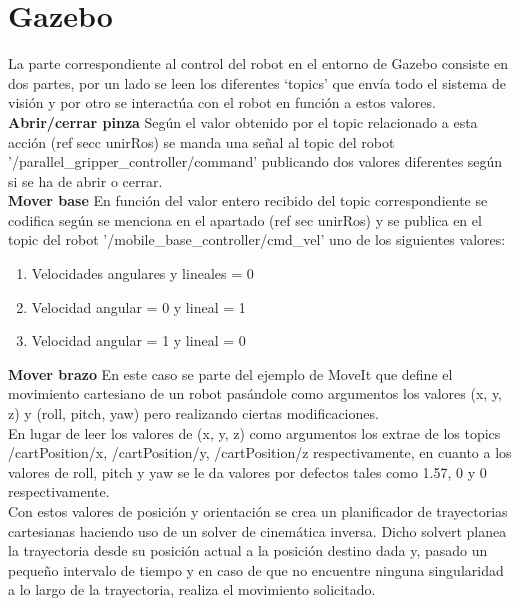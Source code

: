 \section{Gazebo}
La parte correspondiente al control del robot en el entorno de Gazebo consiste en dos partes, por un lado se leen los diferentes ‘topics’ que envía todo el sistema de visión y por otro se interactúa con el robot en función a estos valores.\\
\textbf{Abrir/cerrar pinza}
Según el valor obtenido por el topic relacionado a esta acción (ref secc unirRos) se manda una señal al topic del robot '/parallel_gripper_controller/command'  publicando dos valores diferentes según si se ha de abrir o cerrar.\\
\textbf{Mover base}
En función del valor entero recibido del topic correspondiente se codifica según se menciona en el apartado (ref sec unirRos) y se publica en el topic del robot '/mobile_base_controller/cmd_vel' uno de los siguientes valores:\\
\begin{enumerate}
  \item Velocidades angulares y lineales = 0
  \item Velocidad angular = 0 y lineal = 1
  \item Velocidad angular = 1 y lineal = 0
\end{enumerate}
\textbf{Mover brazo}
En este caso se parte del ejemplo de MoveIt que define el movimiento cartesiano de un robot pasándole como argumentos los valores (x, y, z) y (roll, pitch, yaw) pero realizando ciertas modificaciones.\\

En lugar de leer los valores de (x, y, z) como argumentos los extrae de los topics /cartPosition/x, /cartPosition/y, /cartPosition/z respectivamente, en cuanto a los valores de roll, pitch y yaw se le da valores por defectos tales como 1.57, 0 y 0 respectivamente.\\

Con estos valores de posición y orientación se crea un planificador de trayectorias cartesianas haciendo uso de un solver de cinemática inversa. Dicho solvert planea la trayectoria desde su posición actual a la posición destino dada y, pasado un pequeño intervalo de tiempo y en caso de que no encuentre ninguna singularidad a lo largo de la trayectoria, realiza el movimiento solicitado.\\

